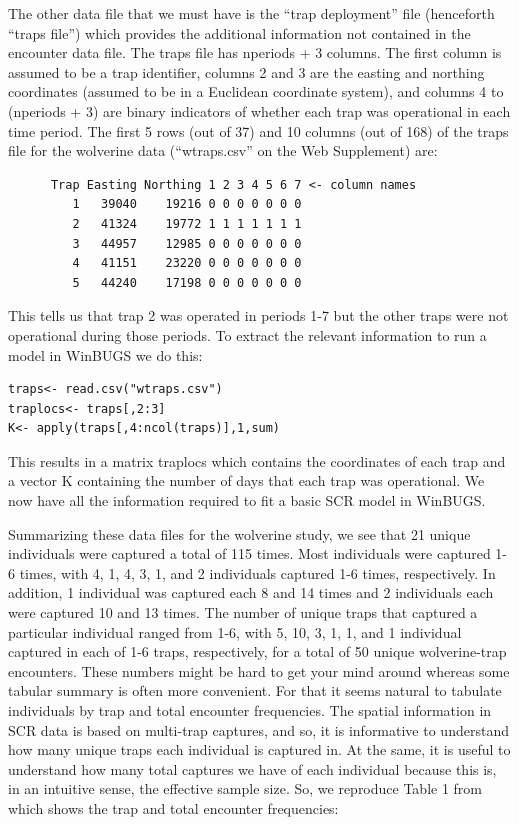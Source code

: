 The other data file that we must have is the ``trap deployment'' file (henceforth ``traps file'') which provides the additional information not contained in the encounter data file. The traps file has nperiods + 3 columns. The first column is assumed to be a trap identifier, columns 2 and 3 are the easting and northing coordinates (assumed to be in a Euclidean coordinate system), and columns 4 to (nperiods + 3) are binary indicators of whether each trap was operational in each time period. The first 5 rows (out of 37) and 10 columns (out of 168) of the traps file for the wolverine data (``wtraps.csv'' on the Web Supplement) are:

\begin{verbatim}
      Trap Easting Northing 1 2 3 4 5 6 7 <- column names
         1   39040    19216 0 0 0 0 0 0 0
         2   41324    19772 1 1 1 1 1 1 1
         3   44957    12985 0 0 0 0 0 0 0
         4   41151    23220 0 0 0 0 0 0 0
         5   44240    17198 0 0 0 0 0 0 0
\end{verbatim}

This tells us that trap 2 was operated in periods 1-7 but the other traps were not operational during those periods. To extract the relevant information to run a model in WinBUGS we do this:

\begin{verbatim}
traps<- read.csv("wtraps.csv")
traplocs<- traps[,2:3]
K<- apply(traps[,4:ncol(traps)],1,sum)
\end{verbatim}

This results in a matrix traplocs which contains the coordinates of each trap and a vector K containing the number of days that each trap was operational. We now have all the information required to fit a basic SCR model in WinBUGS.

Summarizing these data files for the wolverine study, we see that 21
unique individuals were captured a total of 115 times. Most
individuals were captured 1-6 times, with 4, 1, 4, 3, 1, and 2
individuals captured 1-6 times, respectively.  In addition, 1
individual was captured each 8 and 14 times and 2 individuals each
were captured 10 and 13 times.  The number of unique traps that
captured a particular individual ranged from 1-6, with 5, 10, 3, 1, 1,
and 1 individual captured in each of 1-6 traps, respectively, for a
total of 50 unique wolverine-trap encounters.  These numbers might be
hard to get your mind around whereas some tabular summary is often
more convenient. For that it seems natural to tabulate individuals by
trap and total encounter frequencies. The spatial information in SCR
data is based on multi-trap captures, and so, it is informative to
understand how many unique traps each individual is captured in. At
the same, it is useful to understand how many total captures we have
of each individual because this is, in an intuitive sense, the
effective sample size.  So, we reproduce Table 1 from
\citet{royle_etal:2011} which shows the trap and total encounter
frequencies:

